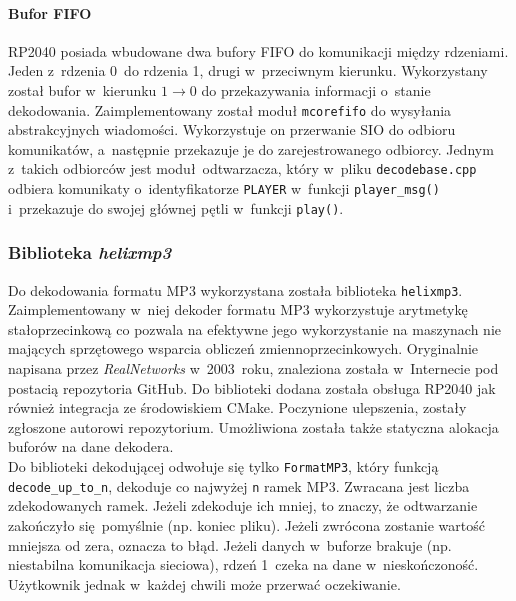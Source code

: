 \documentclass[polish]{aghengthesis}
\begin{document}
			\paragraph{Bufor FIFO}
				RP2040 posiada wbudowane dwa bufory FIFO do komunikacji między rdzeniami. Jeden z~rdzenia 0~do rdzenia 1, drugi w~przeciwnym kierunku. Wykorzystany został bufor w~kierunku $1 \rightarrow 0$ do przekazywania informacji o~stanie dekodowania. Zaimplementowany został moduł \lstinline|mcorefifo| do wysyłania abstrakcyjnych wiadomości. Wykorzystuje on przerwanie SIO do odbioru komunikatów, a~następnie przekazuje je do zarejestrowanego odbiorcy. Jednym z~takich odbiorców jest moduł odtwarzacza, który w~pliku \lstinline|decodebase.cpp| odbiera komunikaty o~identyfikatorze \lstinline|PLAYER| w~funkcji \lstinline|player_msg()| i~przekazuje do swojej głównej pętli w~funkcji \lstinline|play()|.
		
		\subsubsection{Biblioteka \textit{helixmp3}}
			Do dekodowania formatu MP3 wykorzystana została biblioteka \lstinline|helixmp3|.
			Zaimplementowany w~niej dekoder formatu MP3 wykorzystuje arytmetykę stałoprzecinkową co pozwala na efektywne jego wykorzystanie na maszynach nie mających sprzętowego wsparcia obliczeń zmiennoprzecinkowych.
			Oryginalnie napisana przez \textit{RealNetworks}\textsuperscript{\cite{realnetworks}} w~2003~roku, znaleziona została w~Internecie pod postacią repozytoria GitHub\textsuperscript{\cite{helixmp3_repo}}. Do biblioteki dodana została obsługa RP2040 jak również integracja ze środowiskiem CMake.
			Poczynione ulepszenia, zostały zgłoszone autorowi repozytorium\textsuperscript{\cite{helixmp3_pr}}. Umożliwiona została także statyczna alokacja buforów na dane dekodera.
			$ $\\
			
			Do biblioteki dekodującej odwołuje się tylko \lstinline|FormatMP3|, który funkcją \lstinline|decode_up_to_n|, dekoduje co najwyżej \lstinline|n| ramek MP3. Zwracana jest liczba zdekodowanych ramek. Jeżeli zdekoduje ich mniej, to znaczy, że odtwarzanie zakończyło się pomyślnie (np. koniec pliku). Jeżeli zwrócona zostanie wartość mniejsza od zera, oznacza to błąd. Jeżeli danych w~buforze brakuje (np. niestabilna komunikacja sieciowa), rdzeń 1~czeka na dane w~nieskończoność. Użytkownik jednak w~każdej chwili może przerwać oczekiwanie.
		
\end{document}
